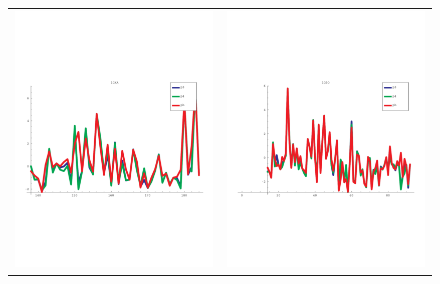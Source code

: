 \documentclass[a4paper,12pt]{article}
\begin{document}
\begin{figure}[t]
\begin{tabular}{cc}
       \includegraphics[trim=0cm 8cm 0cm 6cm,clip,width=8.5cm]{images/1CKA_simil_bypos.pdf} &
       \includegraphics[trim=0cm 8cm 0cm 6cm,clip,width=8.5cm]{images/1G9O_simil_bypos.pdf} \\

\end{tabular}
\end{figure}
\end{document}
